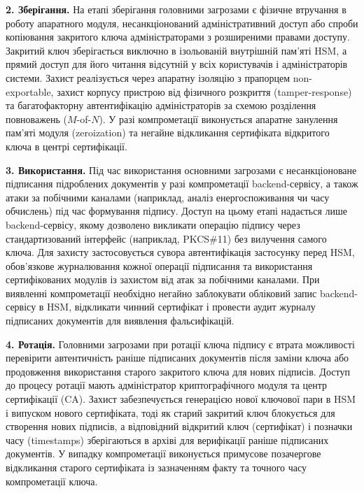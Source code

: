 \textbf{2. Зберігання.}
На етапі зберігання головними загрозами є фізичне втручання в роботу апаратного модуля,
несанкціонований адміністративний доступ або спроби копіювання закритого ключа адміністраторами з
розширеними правами доступу. Закритий ключ зберігається виключно в ізольованій внутрішній пам'яті HSM,
а прямий доступ для його читання відсутній у всіх користувачів і адміністраторів системи. Захист реалізується
через апаратну ізоляцію з прапорцем non-exportable, захист корпусу пристрою від фізичного розкриття
(tamper-response) та багатофакторну автентифікацію адміністраторів за схемою розділення повноважень
($M$-of-$N$). У разі компрометації виконується апаратне занулення пам'яті модуля (zeroization) та негайне
відкликання сертифіката відкритого ключа в центрі сертифікації.

\textbf{3. Використання.}
Під час використання основними загрозами є несанкціоноване підписання підроблених документів у разі
компрометації backend-сервісу, а також атаки за побічними каналами (наприклад, аналіз енергоспоживання
чи часу обчислень) під час формування підпису. Доступ на цьому етапі надається лише backend-сервісу,
якому дозволено викликати операцію підпису через стандартизований інтерфейс (наприклад, PKCS\#11) без
вилучення самого ключа. Для захисту застосовується сувора автентифікація застосунку перед HSM,
обов'язкове журналювання кожної операції підписання та використання сертифікованих модулів із захистом
від атак за побічними каналами. При виявленні компрометації необхідно негайно заблокувати обліковий запис
backend-сервісу в HSM, відкликати чинний сертифікат і провести аудит журналу підписаних документів
для виявлення фальсифікацій.

\textbf{4. Ротація.}
Головними загрозами при ротації ключа підпису є втрата можливості перевірити автентичність раніше
підписаних документів після заміни ключа або продовження використання старого закритого ключа для
нових підписів. Доступ до процесу ротації мають адміністратор криптографічного модуля та центр
сертифікації (CA). Захист забезпечується генерацією нової ключової пари в HSM і випуском нового
сертифіката, тоді як старий закритий ключ блокується для створення нових підписів, а відповідний відкритий
ключ (сертифікат) і позначки часу (timestamps) зберігаються в архіві для верифікації раніше підписаних
документів. У випадку компрометації виконується примусове позачергове відкликання старого сертифіката із
зазначенням факту та точного часу компрометації ключа.

